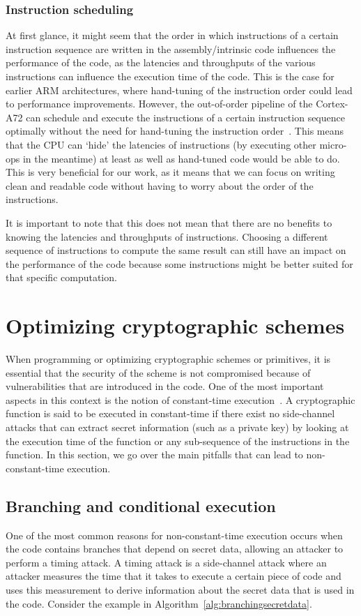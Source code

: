 \documentclass[11pt,a4paper]{report}
\theoremstyle{definition}
\begin{document}
\subsubsection{Instruction scheduling}
At first glance, it might seem that the order in which instructions of a certain instruction sequence are written in the assembly/intrinsic code influences the performance of the code, as the latencies and throughputs of the various instructions can influence the execution time of the code. This is the case for earlier ARM architectures, where hand-tuning of the instruction order could lead to performance improvements. However, the out-of-order pipeline of the Cortex-A72 can schedule and execute the instructions of a certain instruction sequence optimally without the need for hand-tuning the instruction order~\cite{ARM_Cortex_A72_TRM}. This means that the CPU can `hide' the latencies of instructions (by executing other micro-ops in the meantime) at least as well as hand-tuned code would be able to do. This is very beneficial for our work, as it means that we can focus on writing clean and readable code without having to worry about the order of the instructions.

It is important to note that this does not mean that there are no benefits to knowing the latencies and throughputs of instructions. Choosing a different sequence of instructions to compute the same result can still have an impact on the performance of the code because some instructions might be better suited for that specific computation.

\section{Optimizing cryptographic schemes}
\label{sec:optimizingcrypto}
When programming or optimizing cryptographic schemes or primitives, it is essential that the security of the scheme is not compromised because of vulnerabilities that are introduced in the code. One of the most important aspects in this context is the notion of constant-time execution~\cite{kocher1996timing}. A cryptographic function is said to be executed in constant-time if there exist no side-channel attacks that can extract secret information (such as a private key) by looking at the execution time of the function or any sub-sequence of the instructions in the function. In this section, we go over the main pitfalls that can lead to non-constant-time execution.

\subsection{Branching and conditional execution}
\label{sec:branching}
One of the most common reasons for non-constant-time execution occurs when the code contains branches that depend on secret data, allowing an attacker to perform a timing attack. A timing attack is a side-channel attack where an attacker measures the time that it takes to execute a certain piece of code and uses this measurement to derive information about the secret data that is used in the code. Consider the example in Algorithm~\ref{alg:branchingsecretdata}.
\end{document}
